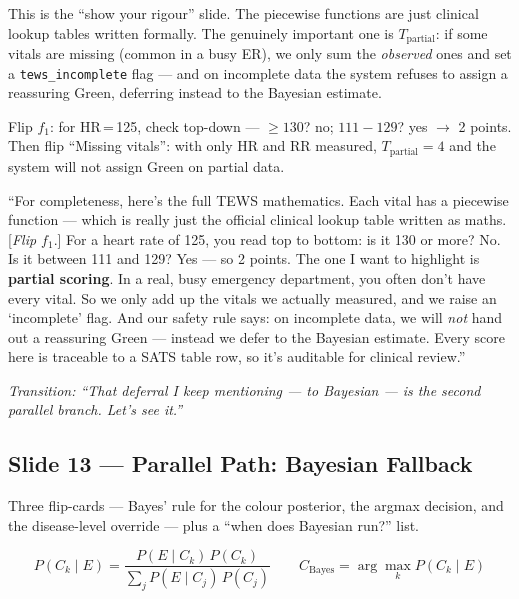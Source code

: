 \documentclass[11pt]{article}
\newcommand{\transition}[1]{\medskip\noindent\textit{\textcolor{mutel}{Transition: #1}}\medskip}
\newcommand{\route}[1]{{\small\texttt{\textcolor{mutel}{#1}}}}
\newcommand{\slide}[3]{%
  \subsection{Slide #1 --- #2}%
  \noindent\route{Route: #3}\par\smallskip}
\begin{document}
\begin{idea}
This is the ``show your rigour'' slide. The piecewise functions are just clinical lookup tables written
formally. The genuinely important one is \textbf{$T_{\mathrm{partial}}$}: if some vitals are missing
(common in a busy ER), we only sum the \emph{observed} ones and set a \texttt{tews\_incomplete} flag ---
and on incomplete data the system refuses to assign a reassuring Green, deferring instead to the Bayesian
estimate.
\end{idea}

\begin{demo}
Flip $f_1$: for HR\,=\,125, check top-down --- $\ge130$? no; $111\!-\!129$? yes $\rightarrow$ 2 points.
Then flip ``Missing vitals'': with only HR and RR measured, $T_{\mathrm{partial}}=4$ and the system will
not assign Green on partial data.
\end{demo}

\begin{saybox}
``For completeness, here's the full TEWS mathematics. Each vital has a piecewise function --- which is
really just the official clinical lookup table written as maths. [\emph{Flip $f_1$}.] For a heart rate of
125, you read top to bottom: is it 130 or more? No. Is it between 111 and 129? Yes --- so 2 points. The one
I want to highlight is \textbf{partial scoring}. In a real, busy emergency department, you often don't have
every vital. So we only add up the vitals we actually measured, and we raise an `incomplete' flag. And our
safety rule says: on incomplete data, we will \emph{not} hand out a reassuring Green --- instead we defer
to the Bayesian estimate. Every score here is traceable to a SATS table row, so it's auditable for clinical
review.''
\end{saybox}

\transition{``That deferral I keep mentioning --- to Bayesian --- is the second parallel branch. Let's see it.''}

\slide{13}{Parallel Path: Bayesian Fallback}{/dashboard/pipeline/bayesian-fallback}

\begin{onscreen}
Three flip-cards --- Bayes' rule for the colour posterior, the argmax decision, and the disease-level
override --- plus a ``when does Bayesian run?'' list.
\end{onscreen}

\[
P(C_k\mid E)=\frac{P(E\mid C_k)\,P(C_k)}{\sum_j P(E\mid C_j)\,P(C_j)}
\qquad
C_{\mathrm{Bayes}}=\arg\max_k P(C_k\mid E)
\]
\end{document}
